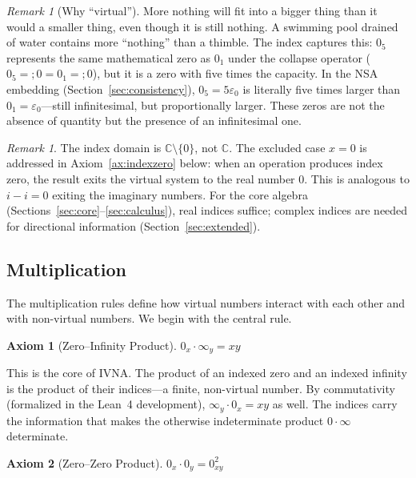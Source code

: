 \documentclass[12pt]{article}
\theoremstyle{definition}
\newtheorem{axiom}{Axiom}
\theoremstyle{remark}
\newtheorem{remark}[theorem]{Remark}
\newcommand{\vz}[1]{0_{#1}}             %
\newcommand{\vi}[1]{\infty_{#1}}        %
\newcommand{\vzn}[2]{0^{#1}_{#2}}       %
\newcommand{\ceq}{\mathrel{=\!\!;}}     %
\newcommand{\C}{\mathbb{C}}
\begin{document}
\begin{remark}[Why ``virtual'']
More nothing will fit into a bigger thing than it would a smaller
thing, even though it is still nothing. A swimming pool drained of
water contains more ``nothing'' than a thimble. The index captures
this: $\vz{5}$ represents the same mathematical zero as $\vz{1}$
under the collapse operator ($\vz{5} \ceq 0 = \vz{1} \ceq 0$),
but it is a zero with five times the capacity. In the NSA embedding
(Section~\ref{sec:consistency}), $\vz{5} = 5\varepsilon_0$ is
literally five times larger than $\vz{1} = \varepsilon_0$---still
infinitesimal, but proportionally larger. These zeros are not the
absence of quantity but the presence of an infinitesimal one.
\end{remark}

\begin{remark}
The index domain is $\C \setminus \{0\}$, not $\C$. The excluded case
$x = 0$ is addressed in Axiom~\ref{ax:indexzero} below: when an
operation produces index zero, the result exits the virtual system
to the real number $0$. This is analogous to $i - i = 0$ exiting
the imaginary numbers. For the core algebra (Sections~\ref{sec:core}--\ref{sec:calculus}),
real indices suffice; complex indices are needed for directional
information (Section~\ref{sec:extended}).
\end{remark}

\subsection{Multiplication}

The multiplication rules define how virtual numbers interact with each
other and with non-virtual numbers. We begin with the central rule.

\begin{axiom}[Zero--Infinity Product]
\label{ax:zi}
$\vz{x} \cdot \vi{y} = xy$
\end{axiom}

This is the core of IVNA. The product of an indexed zero and an
indexed infinity is the product of their indices---a finite,
non-virtual number. By commutativity (formalized in the Lean~4
development), $\vi{y} \cdot \vz{x} = xy$ as well. The indices carry
the information that makes the otherwise indeterminate product
$0 \cdot \infty$ determinate.

\begin{axiom}[Zero--Zero Product]
\label{ax:zz}
$\vz{x} \cdot \vz{y} = \vzn{2}{xy}$
\end{axiom}
\end{document}
